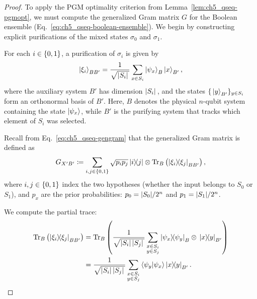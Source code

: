 \begin{proof}
To apply the PGM optimality criterion from Lemma~\ref{lem:ch5_qseq-pgmopt}, we must compute the generalized Gram matrix $G$ for the Boolean ensemble (Eq.~\eqref{eq:ch5_qseq-boolean-ensemble}).
We begin by constructing explicit purifications of the mixed states $\sigma_0$ and $\sigma_1$.

For each $i \in \{ 0, 1 \}$, a purification of $\sigma_i$ is given by
\begin{equation}
    \ket{\xi_i}_{BB'} = \frac{1}{\sqrt{\abs*{S_i}}} \sum_{x \in S_i} \ket{\psi_x}_B \ket{x}_{B'},
\end{equation}
where the auxiliary system $B'$ has dimension $\abs*{S_i}$, and the states $\{\ket*{y}_{B'}\}_{y \in S_i}$ form an orthonormal basis of $B'$.
Here, $B$ denotes the physical $n$-qubit system containing the state $\ket{\psi_x}$, while $B'$ is the purifying system that tracks which element of $S_i$ was selected.

Recall from Eq.~\eqref{eq:ch5_qseq-gengram} that the generalized Gram matrix is defined as
\begin{equation}
    G_{X'B'} \coloneqq \sum_{i,j \in \{ 0, 1 \}} \sqrt{p_i p_j} \ketbra{i}{j} \otimes \Tr_B\left(\ketbra{\xi_i}{\xi_j}_{BB'}\right),
\end{equation}
where $i, j \in \{ 0, 1 \}$ index the two hypotheses (whether the input belongs to $S_0$ or $S_1$), and $p_x$ are the prior probabilities: $p_0 = \abs{S_0}/2^n$ and $p_1 = \abs{S_1}/2^n$.

We compute the partial trace:
\begin{equation}
    \begin{aligned}
        \Tr_B\left(\ketbra{\xi_i}{\xi_j}_{BB'}\right)
        &= \Tr_B\left(\frac{1}{\sqrt{\abs*{S_i}\abs*{S_j}}} \sum_{\substack{x \in S_i \\ y \in S_j}} \ketbra{\psi_x}{\psi_y}_B \otimes \ketbra*{x}{y}_{B'}\right) \\
        &= \frac{1}{\sqrt{\abs*{S_i}\abs*{S_j}}} \sum_{\substack{x \in S_i \\ y \in S_j}} \braket{\psi_y}{\psi_x} \!\ketbra*{x}{y}_{B'}.
    \end{aligned}
\end{equation}


\end{proof}
